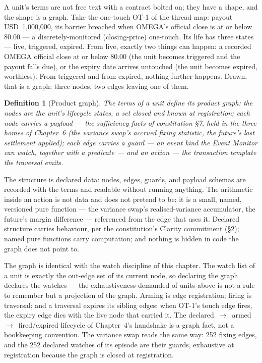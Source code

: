 \documentclass[11pt,a4paper]{article}
\newcommand{\USD}[1]{\mbox{USD~#1}}
\newtheorem{definition}{Definition}[section]
\begin{document}
A unit's terms are not free text with a contract bolted on; they have a shape, and the
shape is a graph. Take the one-touch OT-1 of the thread map: payout \USD{1{,}000{,}000},
its barrier breached when OMEGA's official close is at or below 80.00 --- a
discretely-monitored (closing-price) one-touch. Its life has three states --- live,
triggered, expired. From live, exactly two things can happen: a recorded OMEGA official
close at or below 80.00 (the unit becomes triggered and the payout falls due), or the
expiry date arrives untouched (the unit becomes expired, worthless). From triggered and
from expired, nothing further happens. Drawn, that is a graph: three nodes, two edges
leaving one of them.

\begin{definition}[Product graph]\label{def:product-graph}
The terms of a unit define its \emph{product graph}: the nodes are the unit's lifecycle
states, a set closed and known at registration; each node carries a payload --- the
sufficiency facts of constitution \S 7, held in the three homes of Chapter~6 (the
variance swap's accrued fixing statistic, the future's last settlement applied); each
edge carries a \emph{guard} --- an event kind the Event Monitor can watch, together with
a predicate --- and an \emph{action} --- the transaction template the traversal emits.
\end{definition}

The structure is declared data: nodes, edges, guards, and payload schemas are recorded
with the terms and readable without running anything. The arithmetic inside an action is
not data and does not pretend to be: it is a small, named, versioned pure function ---
the variance swap's realised-variance accumulator, the future's margin difference ---
referenced from the edge that uses it. Declared structure carries behaviour, per the
constitution's Clarity commitment (\S 2); named pure functions carry computation; and
nothing is hidden in code the graph does not point to.

The graph is identical with the watch discipline of this chapter. The watch list of a
unit is exactly the out-edge set of its current node, so declaring the graph declares
the watches --- the exhaustiveness demanded of units above is not a rule to remember but
a projection of the graph. Arming is edge registration; firing is traversal; and a
traversal expires its sibling edges: when OT-1's touch edge fires, the expiry edge dies
with the live node that carried it. The declared~$\to$~armed~$\to$~fired/expired
lifecycle of Chapter~4's handshake is a graph fact, not a bookkeeping convention. The
variance swap reads the same way: 252 fixing edges, and the 252 declared watches of its
episode are their guards, exhaustive at registration because the graph is closed at
registration.
\end{document}
